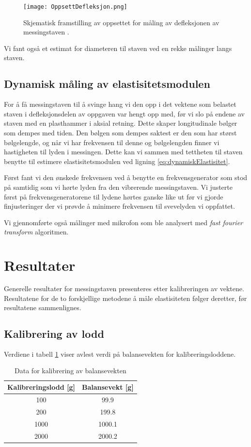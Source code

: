 \documentclass[a4paper,11pt, twocolumn]{article}
\begin{document}
\begin{figure}[!ht]
\texttt{[image: OppsettDefleksjon.png]}
\caption{Skjematisk framstilling av oppsettet for måling av defleksjonen av messingstaven \cite{oppgavetekst}.}
\label{fig:oppsett}
\end{figure}

Vi fant også et estimat for diameteren til staven ved en rekke målinger langs staven.

\subsection{Dynamisk måling av elastisitetsmodulen}
For å få messingstaven til å svinge hang vi den opp i det vektene som belastet staven i defleksjonsdelen av oppgaven var hengt opp med, før vi slo på endene av staven med en plasthammer i aksial retning. Dette skaper longitudinale bølger som dempes med tiden. Den bølgen som dempes saktest er den som har størst bølgelengde, og når vi har frekvensen til denne og bølgelengden finner vi hastigheten til lyden i messingen. Dette kan vi sammen med tettheten til staven benytte til estimere elastisitetsmodulen ved ligning \eqref{eq:dynamiskElastisitet}.

Først fant vi den ønskede frekvensen ved å benytte en frekvensgenerator som stod på samtidig som vi hørte lyden fra den vibrerende messingstaven. Vi justerte først på frekvensgeneratorene til lydene hørtes ganske like ut før vi gjorde finjusteringer der vi prøvde å minimere frekvensen til svevelyden vi oppfattet.

Vi gjennomførte også målinger med mikrofon som ble analysert med \textit{fast fourier transform} algoritmen.

\section{Resultater}
Generelle resultater for messingstaven presenteres etter kalibreringen av vektene. Resultatene for de to forskjellige metodene å måle elastisiteten følger deretter, før resultatene sammenlignes.

\subsection{Kalibrering av lodd}

Verdiene i tabell \ref{tab:kalibrering} viser avlest verdi på balansevekten for kalibreringsloddene.

\begin{table}[!ht]
\centering
\caption{Data for kalibrering av balansevekten}
\label{tab:kalibrering}
\begin{tabular}{cc}
	\toprule
	\toprule
	Kalibreringslodd [g] & Balansevekt [g]\\
	\hline
	100 & 99.9\\
	200 & 199.8\\
	1000 & 1000.1\\
	2000 & 2000.2\\
	\toprule
\end{tabular}
\end{table}
\end{document}
